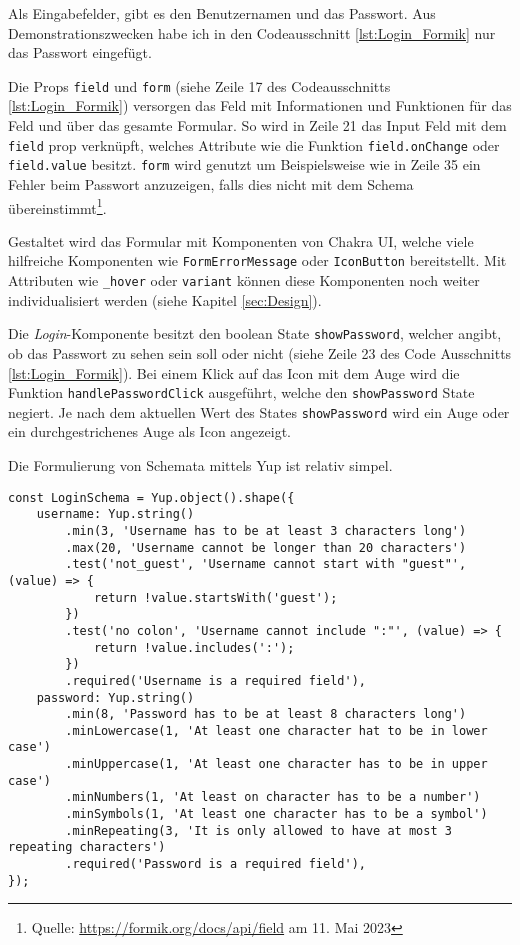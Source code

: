 Als Eingabefelder, gibt es  den Benutzernamen und das Passwort. Aus Demonstrationszwecken habe ich in den Codeausschnitt \ref{lst:Login_Formik} nur das Passwort eingefügt.

Die Props \verb|field| und \verb|form| (siehe Zeile 17 des Codeausschnitts \ref{lst:Login_Formik}) versorgen das Feld mit Informationen und Funktionen für das Feld und über das gesamte Formular. So wird in Zeile 21 das Input Feld mit dem \verb|field| prop verknüpft, welches Attribute wie die Funktion \verb|field.onChange| oder \verb|field.value| besitzt. \verb|form| wird genutzt um Beispielsweise wie in Zeile 35 ein Fehler beim Passwort anzuzeigen, falls dies nicht mit dem Schema übereinstimmt\footnote{Quelle: \url{https://formik.org/docs/api/field} am 11. Mai 2023}.

Gestaltet wird das Formular mit Komponenten von Chakra UI, welche viele hilfreiche Komponenten wie \verb|FormErrorMessage| oder \verb|IconButton| bereitstellt. Mit Attributen wie \verb|_hover| oder \verb|variant| können diese Komponenten noch weiter individualisiert werden (siehe Kapitel \ref{sec:Design}).

Die \textit{Login}-Komponente besitzt den boolean State \verb|showPassword|, welcher angibt, ob das Passwort zu sehen sein soll oder nicht (siehe Zeile 23 des Code Ausschnitts \ref{lst:Login_Formik}). Bei einem Klick auf das Icon mit dem Auge wird die Funktion \verb|handlePasswordClick| ausgeführt, welche den \verb|showPassword| State negiert. Je nach dem aktuellen Wert des States \verb|showPassword| wird ein Auge oder ein durchgestrichenes Auge als Icon angezeigt.

Die Formulierung von Schemata mittels Yup ist relativ simpel.

\begin{lstlisting}[style=codeStyle, caption={Yup Schma für das Anmelden}, label={lst:Yup-Login}]
const LoginSchema = Yup.object().shape({
    username: Yup.string()
        .min(3, 'Username has to be at least 3 characters long')
        .max(20, 'Username cannot be longer than 20 characters')
        .test('not_guest', 'Username cannot start with "guest"', (value) => {
            return !value.startsWith('guest');
        })
        .test('no colon', 'Username cannot include ":"', (value) => {
            return !value.includes(':');
        })
        .required('Username is a required field'),
    password: Yup.string()
        .min(8, 'Password has to be at least 8 characters long')
        .minLowercase(1, 'At least one character hat to be in lower case')
        .minUppercase(1, 'At least one character has to be in upper case')
        .minNumbers(1, 'At least on character has to be a number')
        .minSymbols(1, 'At least one character has to be a symbol')
        .minRepeating(3, 'It is only allowed to have at most 3 repeating characters')
        .required('Password is a required field'),
});
\end{lstlisting}

